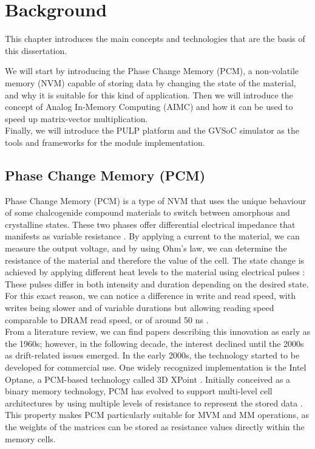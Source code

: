 
\chapter{Background}\label{chap:background}
This chapter introduces the main concepts and technologies that are the basis of this dissertation.

We will start by introducing the Phase Change Memory (PCM), a non-volatile memory (NVM) capable of storing data by changing the state of the material, and why it is suitable for this kind of application.
Then we will introduce the concept of Analog In-Memory Computing (AIMC) and how it can be used to speed up matrix-vector multiplication.\\
Finally, we will introduce the PULP platform and the GVSoC simulator as the tools and frameworks for the module implementation.

\newpage
\section{Phase Change Memory (PCM)}\label{sec:pcm}

Phase Change Memory (PCM)  is a type of NVM that uses the unique behaviour of some chalcogenide compound materials to switch between amorphous and crystalline states. These two phases offer differential electrical impedance that manifests as variable resistance \cite{gallo_overview_2020,he_-memory_2023}.
By applying a current to the material, we can measure the output voltage, and by using Ohm's law, we can determine the resistance of the material and therefore the value of the cell.
The state change is achieved by applying different heat levels to the material using electrical pulses : These pulses differ in both intensity and duration depending on the desired state.
For this exact reason, we can notice a difference in write and read speed,  with writes being slower and of variable durations but allowing reading speed comparable to DRAM read speed, or of around 50 ns \cite{srinivasan_study_2013}.\\

From a literature review, we can find papers describing this innovation as early as the 1960s; however, in the following decade, the interest declined until the 2000s as drift-related issues emerged. In the early 2000s, the technology started to be developed for commercial use. One widely recognized implementation is the Intel Optane, a PCM-based technology called 3D XPoint \cite{gallo_overview_2020,he_-memory_2023}.
Initially conceived as a binary memory technology, PCM has evolved to support multi-level cell architectures by using multiple levels of resistance to represent the stored data \cite{antolini_readout_2024}.
This property makes PCM particularly suitable for MVM and MM operations, as the weights of the matrices can be stored as resistance values directly within the memory cells.

